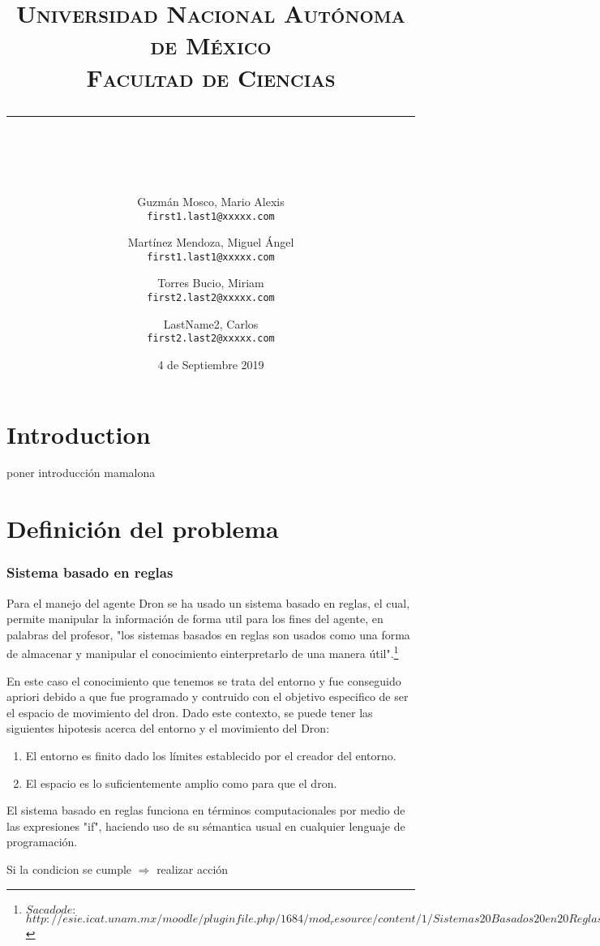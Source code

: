 \documentclass[10pt, a4paper]{article}
\title{\begin{center}
 {\LARGE \scshape Universidad Nacional Aut\'onoma de M\'exico \\ Facultad de Ciencias }
  \rule{1\textwidth}{2.0pt}\\
\end{center}}
\author{
  Guzmán Mosco, Mario Alexis\\
  \texttt{first1.last1@xxxxx.com}
  \and  
  Mart\'inez Mendoza, Miguel \'Angel\\
  \texttt{first1.last1@xxxxx.com}
  \and
  Torres Bucio, Miriam\\
  \texttt{first2.last2@xxxxx.com}
  \and
  LastName2, Carlos\\
  \texttt{first2.last2@xxxxx.com}
}
\date{4 de Septiembre 2019}
\begin{document}
\maketitle

\section{Introduction}


poner introducci\'on mamalona


\section{Definición del problema}
\subsubsection{Sistema basado en reglas}
Para el manejo del agente Dron se ha usado un sistema basado en reglas, el cual, permite manipular la información de forma util para los fines del agente, en palabras del profesor, "los sistemas basados en reglas son usados como una forma de almacenar y manipular el conocimiento einterpretarlo de una manera útil".\footnote{$ Sacado de: $ \\ $http://esie.icat.unam.mx/moodle/pluginfile.php/1684/mod_resource/content/1/Sistemas20Basados20en20Reglas.pdf$ }

En este caso el conocimiento que tenemos se trata del entorno y fue conseguido apriori  debido a que fue programado y contruido con el objetivo especifico de ser el espacio de movimiento del dron. Dado este contexto, se puede tener las siguientes hipotesis acerca del entorno y el movimiento del Dron:

\begin{enumerate}
\item El entorno es finito dado los límites establecido por el creador del entorno.
\item El espacio es lo suficientemente amplio como para que el dron.
\end{enumerate}

El sistema basado en reglas funciona en términos computacionales por medio de las expresiones "if", haciendo uso de su sémantica usual en cualquier lenguaje de programación.

Si la condicion se cumple $\Rightarrow$ realizar acción
\end{document}
